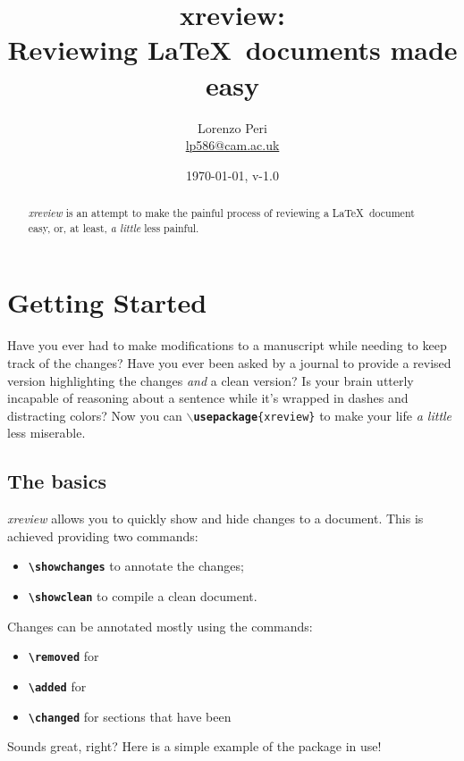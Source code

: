 \documentclass[a4paper]{ltxdoc}
\title{\textbf{xreview}: \\ \Large{Reviewing
\LaTeX~documents made easy}}
\author{Lorenzo Peri\\\textcolor{blue}{\href{mailto:lp586@cam.ac.uk}{lp586@cam.ac.uk}}}
\date{\today, v-1.0}
\newcommand{\writecommand}[1]{\texttt{\textbf{{\textbackslash#1}}}}
\begin{document}
\maketitle

\begin{abstract}
    \textit{xreview} is an attempt to make the painful process of reviewing a \LaTeX~document easy, or, at least, \textit{a little} less painful.
\end{abstract}

\tableofcontents

\section{Getting Started}

Have you ever had to make modifications to a manuscript while needing to keep track of the changes? Have you ever been asked by a journal to provide a revised version highlighting the changes \textit{and} a clean version? Is your brain utterly incapable of reasoning about a sentence while it's wrapped in dashes and distracting colors?
Now you can \texttt{\textbf{{$\backslash$usepackage}}\{xreview\}} to make your life \textit{a little} less miserable.

\subsection{The basics}

\textit{xreview} allows you to quickly show and hide changes to a document.
This is achieved providing two commands:
\begin{itemize}
    \item \writecommand{showchanges} to annotate the changes;
    \item \writecommand{showclean} to compile a clean document.
\end{itemize}

Changes can be annotated mostly using the commands:
\begin{itemize}
    \item \writecommand{removed} for 
    \item \writecommand{added} for 
    \item \writecommand{changed} for sections that have been 
\end{itemize}

Sounds great, right? Here is a simple example of the package in use!
\end{document}

